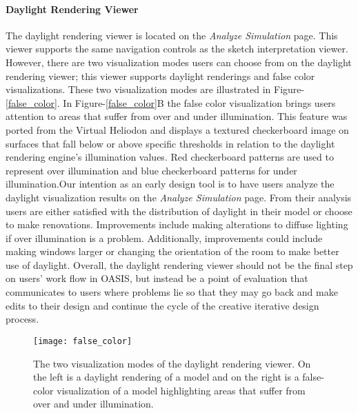 \paragraph{Daylight Rendering Viewer}
The daylight rendering viewer is located on the \textit{Analyze Simulation} page. 
This viewer supports the same navigation controls as the sketch interpretation viewer. However, there are two visualization modes users can choose from on the daylight rendering viewer; this viewer supports daylight renderings and false color visualizations. These two visualization modes are illustrated in Figure-\ref{false_color}.
In Figure-\ref{false_color}B the false color visualization brings users attention to areas that suffer from over and under illumination. This feature was ported from the Virtual Heliodon and displays a textured checkerboard image on surfaces that fall below or above specific thresholds in relation to the daylight rendering engine's illumination values\cite{nasman2013evaluation}. Red checkerboard patterns are used to represent over illumination and blue checkerboard patterns for under illumination.Our intention as an early design tool is to have users analyze the daylight visualization results on the \textit{Analyze Simulation} page. From their analysis users are either satisfied with the distribution of daylight in their model or choose to make renovations. Improvements include making alterations to diffuse lighting if over illumination is a problem. Additionally, improvements could include making windows larger or changing the orientation of the room to make better use of daylight. Overall, the daylight rendering viewer should not be the final step on users' work flow in OASIS, but instead be a point of evaluation that communicates to users where problems lie so that they may go back and make edits to their design and continue the cycle of the creative iterative design process. 


\begin{figure}[!ht]
\centering
\caption[The two visualization modes of the daylight rendering viewer.]{The two visualization modes of the daylight rendering viewer. On the left is a daylight rendering of a model and on the right is a false-color visualization of a model highlighting areas that suffer from over and under illumination.}
\label{fig:false_color}
\texttt{[image: false\_color]}
\end{figure}

